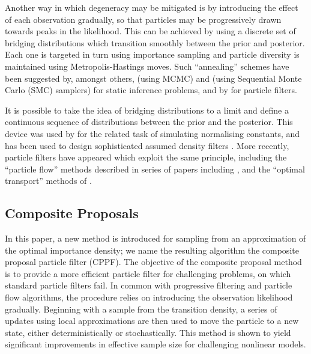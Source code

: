 \documentclass{article}
\begin{document}
Another way in which degeneracy may be mitigated is by introducing the effect of each observation gradually, so that particles may be progressively drawn towards peaks in the likelihood. This can be achieved by using a discrete set of bridging distributions which transition smoothly between the prior and posterior. Each one is targeted in turn using importance sampling and particle diversity is maintained using Metropolis-Hastings moves. Such ``annealing'' schemes have been suggested by, amongst others, \citet{Neal2001} (using MCMC) and \citet{DelMoral2006} (using Sequential Monte Carlo (SMC) samplers) for static inference problems, and by \citet{Godsill2001b,Gall2007,Deutscher2000} for particle filters.

It is possible to take the idea of bridging distributions to a limit and define a continuous sequence of distributions between the prior and the posterior. This device was used by \citet{Gelman1998} for the related task of simulating normalising constants, and has been used to design sophisticated assumed density filters \citep{Hanebeck2003a,Hanebeck2012,Hagmar2011}. More recently, particle filters have appeared which exploit the same principle, including the ``particle flow'' methods described in series of papers including \citep{Daum2008,Daum2011d}, and the ``optimal transport'' methods of \cite{Reich2011,Reich2012a}.

\subsection{Composite Proposals}

In this paper, a new method is introduced for sampling from an approximation of the optimal importance density; we name the resulting algorithm the composite proposal particle filter (CPPF). The objective of the composite proposal method is to provide a more efficient particle filter for challenging problems, on which standard particle filters fail. In common with progressive filtering and particle flow algorithms, the procedure relies on introducing the observation likelihood gradually. Beginning with a sample from the transition density, a series of updates using local approximations are then used to move the particle to a new state, either deterministically or stochastically. This method is shown to yield significant improvements in effective sample size for challenging nonlinear models.

\end{document}
